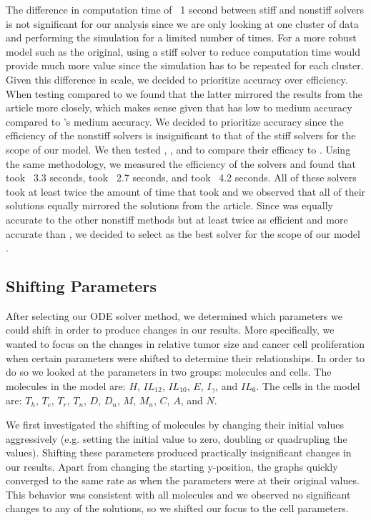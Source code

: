 \documentclass{article}
\begin{document}
The difference in computation time of ~1 second between stiff and nonstiff solvers is not significant for our analysis since we are only looking at one cluster of data and performing the simulation for a limited number of times. For a more robust model such as the original, using a stiff solver to reduce computation time would provide much more value since the simulation has to be repeated for each cluster.  Given this difference in scale, we decided to prioritize accuracy over efficiency. When testing  compared to  we found that the latter mirrored the results from the article more closely, which makes sense given that  has low to medium accuracy compared to ’s medium accuracy. We decided to prioritize accuracy since the efficiency of the nonstiff solvers is insignificant to that of the stiff solvers for the scope of our model. We then tested , , and  to compare their efficacy to . Using the same methodology, we measured the efficiency of the solvers and found that  took ~3.3 seconds,  took ~2.7 seconds, and  took ~4.2 seconds. All of these solvers took at least twice the amount of time that  took and we observed that all of their solutions equally mirrored the solutions from the article. Since  was equally accurate to the other nonstiff methods but at least twice as efficient and more accurate than , we decided to select  as the best solver for the scope of our model \cite{MAT}.

\subsection{Shifting Parameters}
After selecting our ODE solver method, we determined which parameters we could shift in order to produce changes in our results. More specifically, we wanted to focus on the changes in relative tumor size and cancer cell proliferation when certain parameters were shifted to determine their relationships. In order to do so we looked at the parameters in two groups: molecules and cells. The molecules in the model are: $H$, $IL_{12}$, $IL_{10}$, $E$, $I_\gamma$, and $IL_6$. The cells in the model are: $T_h$, $T_c$, $T_r$, $T_n$, $D$, $D_n$, $M$, $M_n$, $C$, $A$, and $N$. 

We first investigated the shifting of molecules by changing their initial values aggressively (e.g. setting the initial value to zero, doubling or quadrupling the values). Shifting these parameters produced practically insignificant changes in our results. Apart from changing the starting y-position, the graphs quickly converged to the same rate as when the parameters were at their original values. This behavior was consistent with all molecules and we observed no significant changes to any of the solutions, so we shifted our focus to the cell parameters.
\end{document}
